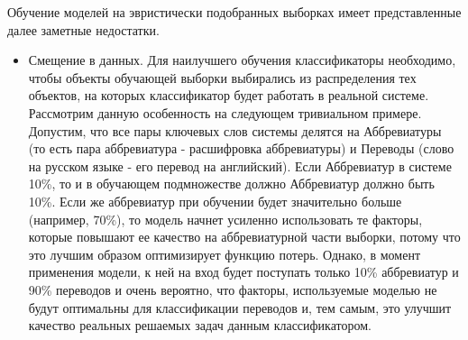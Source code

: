 Обучение моделей на эвристически подобранных выборках имеет представленные далее заметные недостатки.

\begin{itemize}
    \item Смещение в данных. Для наилучшего обучения классификаторы необходимо, чтобы объекты обучающей выборки выбирались из распределения тех объектов, на которых классификатор будет работать в реальной системе. Рассмотрим данную особенность на следующем тривиальном примере. Допустим, что все пары ключевых слов системы делятся на Аббревиатуры (то есть пара аббревиатура - расшифровка аббревиатуры) и Переводы (слово на русском языке - его перевод на английский). Если Аббревиатур в системе 10\%, то и в обучающем подмножестве должно Аббревиатур должно быть 10\%. Если же аббревиатур при обучении будет значительно больше (например, 70\%), то модель начнет усиленно использовать те факторы, которые повышают ее качество на аббревиатурной части выборки, потому что это лучшим образом оптимизирует функцию потерь. Однако, в момент применения модели, к ней на вход будет поступать только 10\% аббревиатур и 90\% переводов и очень вероятно, что факторы, используемые моделью не будут оптимальны для классификации переводов и, тем самым, это улучшит качество реальных решаемых задач данным классификатором.  


\end{itemize}

